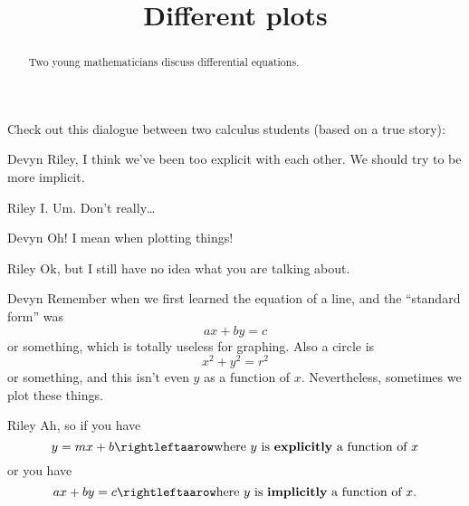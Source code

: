 \documentclass{ximera}
\title[Break-Ground:]{Different plots}
\begin{document}
\begin{abstract}
  Two young mathematicians discuss differential equations.
\end{abstract}
\maketitle








Check out this dialogue between two calculus students (based on a true
story):

\begin{dialogue}
\item[Devyn] Riley, I think we've been too explicit with each
  other. We should try to be more implicit.
\item[Riley] I. Um. Don't really\dots
\item[Devyn] Oh! I mean when plotting things!
\item[Riley] Ok, but I still have no idea what you are talking about.
\item[Devyn] Remember when we first learned the equation of a line, and the ``standard form'' was
  \[
  ax+by = c
  \]
  or something, which is totally useless for graphing. Also a circle is
  \[
  x^2 + y^2 = r^2
  \]
  or something, and this isn't even $y$ as a function of
  $x$. Nevertheless, sometimes we plot these things.
\item[Riley] Ah, so if you have
  \[
  y = mx + b \rightleftaarow \text{where $y$ is \textbf{explicitly} a function of $x$}
  \]
  or you have
    \[
  ax + by = c  \rightleftaarow \text{here $y$ is \textbf{implicitly} a function of $x$.}
  \]
\end{dialogue}


\end{document}
